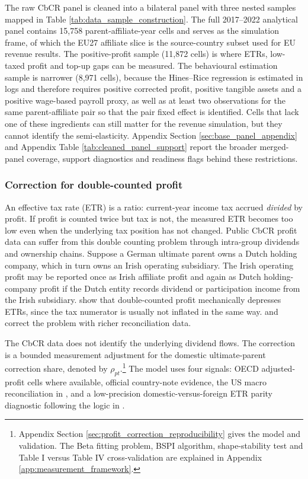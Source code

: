 \documentclass[11pt,a4paper]{article}
\begin{document}
The raw CbCR panel is cleaned into a bilateral panel with three nested samples mapped in Table \ref{tab:data_sample_construction}. The full 2017--2022 analytical panel contains 15{,}758 parent-affiliate-year cells and serves as the simulation frame, of which the EU27 affiliate slice is the source-country subset used for EU revenue results. The positive-profit sample (11{,}872 cells) is where ETRs, low-taxed profit and top-up gaps can be measured. The behavioural estimation sample is narrower (8{,}971 cells), because the Hines--Rice regression is estimated in logs and therefore requires positive corrected profit, positive tangible assets and a positive wage-based payroll proxy, as well as at least two observations for the same parent-affiliate pair so that the pair fixed effect is identified. Cells that lack one of these ingredients can still matter for the revenue simulation, but they cannot identify the semi-elasticity. Appendix Section \ref{sec:base_panel_appendix} and Appendix Table \ref{tab:cleaned_panel_support} report the broader merged-panel coverage, support diagnostics and readiness flags behind these restrictions.



\subsubsection{Correction for double-counted profit}\label{sec:doublecounting}

An effective tax rate (ETR) is a ratio: current-year income tax accrued \emph{divided} by profit. If profit is counted twice but tax is not, the measured ETR becomes too low even when the underlying tax position has not changed. Public CbCR profit data can suffer from this double counting problem through intra-group dividends and ownership chains. Suppose a German ultimate parent owns a Dutch holding company, which in turn owns an Irish operating subsidiary. The Irish operating profit may be reported once as Irish affiliate profit and again as Dutch holding-company profit if the Dutch entity records dividend or participation income from the Irish subsidiary. \citet{blouin2023} show that double-counted profit mechanically depresses ETRs, since the tax numerator is usually not inflated in the same way. \citet{garcia-bernardo2022a} and \citet{hugger2026} correct the problem with richer reconciliation data. 

The CbCR data does not identify the underlying dividend flows. The correction is a bounded measurement adjustment for the domestic ultimate-parent correction share, denoted by $\rho_{pt}$.\footnote{Appendix Section \ref{sec:profit_correction_reproducibility} gives the model and validation. The Beta fitting problem, BSPI algorithm, shape-stability test and Table I versus Table IV cross-validation are explained in Appendix \ref{app:measurement_framework}.} The model uses four signals: OECD adjusted-profit cells where available, official country-note evidence, the US macro reconciliation in \citet{garcia-bernardo2022a}, and a low-precision domestic-versus-foreign ETR parity diagnostic following the logic in \citet{hugger2026}. 
\end{document}
